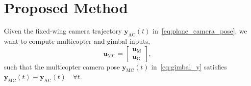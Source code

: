 \documentclass[letterpaper, 10 pt, conference]{ieeeconf}  %
\begin{document}
\section{Proposed Method}
\label{sec:method}

Given the fixed-wing camera trajectory $\mathbf{y}_\text{AC}(t)$ in~\eqref{eq:plane_camera_pose}, we want to compute multicopter and gimbal inputs, 
\begin{equation}
\mathbf{u}_\text{MC} = \begin{bmatrix} \mathbf{u}_\text{M} \\ \mathbf{u}_\text{G} \end{bmatrix},
\label{eq:u_MC}
\end{equation}
such that the multicopter camera pose $\mathbf{y}_\text{MC}(t)$ in~\eqref{eq:gimbal_y} satisfies $\mathbf{y}_\text{MC}(t) \equiv \mathbf{y}_\text{AC}(t) \quad \forall t$.
\end{document}
